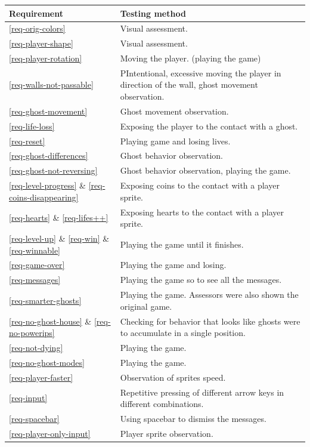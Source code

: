 \documentclass[11pt,a4paper,notitlepage]{report}
\begin{document}
				\begin{center}
					\begin{longtable}{ | p{3cm} | p{7cm} |}
						\hline
						Requirement&Testing method \\ \hline
						\ref{req-orig-colors}&Visual assessment. \\ \hline
						\ref{req-player-shape}&Visual assessment. \\ \hline
						\ref{req-player-rotation}&Moving the player. (playing the game) \\ \hline
						\ref{req-walls-not-passable}&PIntentional, excessive moving the player in direction of the wall, ghost movement observation.\\ \hline
						\ref{req-ghost-movement}&Ghost movement observation.\\ \hline
						\ref{req-life-loss}&Exposing the player to the contact with a ghost.\\ \hline
						\ref{req-reset}&Playing game and losing lives.\\ \hline
						\ref{req-ghost-differences}&Ghost behavior observation.\\ \hline
						\ref{req-ghost-not-reversing}&Ghost behavior observation, playing the game.\\ \hline
						\ref{req-level-progress} \& \ref{req-coins-disappearing}&Exposing coins to the contact with a player sprite.\\ \hline
						\ref{req-hearts} \& \ref{req-lifes++}&Exposing hearts to the contact with a player sprite.\\ \hline
						\ref{req-level-up} \& \ref{req-win} \& \ref{req-winnable}&Playing the game until it finishes.\\ \hline
						\ref{req-game-over}&Playing the game and losing.\\ \hline
						\ref{req-messages}&Playing the game so to see all the messages.\\ \hline
						\ref{req-smarter-ghosts}&Playing the game. Assessors were also shown the original game.\\ \hline
						\ref{req-no-ghost-house} \&
						\ref{req-no-powerips}&Checking for behavior that looks like ghosts were to accumulate in a single position.\\ \hline
						\ref{req-not-dying}&Playing the game.\\ \hline
						\ref{req-no-ghost-modes}&Playing the game.\\ \hline
						\ref{req-player-faster}&Observation of sprites speed.\\ \hline
						\ref{req-input}&Repetitive pressing of different arrow keys in different combinations.\\ \hline
						\ref{req-spacebar}&Using spacebar to dismiss the messages.\\ \hline
						\ref{req-player-only-input}&Player sprite observation.\\ \hline
					\end{longtable}
				\end{center}
\end{document}
